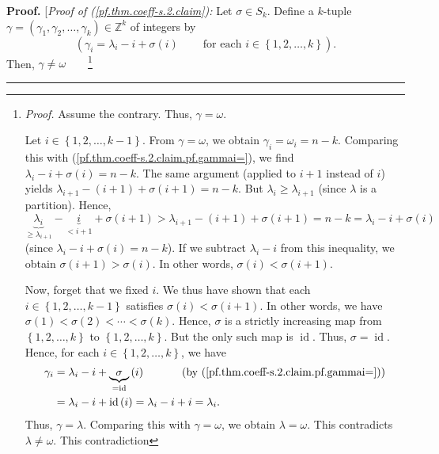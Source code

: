 \documentclass[numbers=enddot,12pt,final,onecolumn,notitlepage]{scrartcl}%
\theoremstyle{definition}
\newenvironment{proof}[1][Proof]{\noindent\textbf{#1.} }{\ \rule{0.5em}{0.5em}}
\begin{document}
\begin{proof}
[\textit{Proof of (\ref{pf.thm.coeff-s.2.claim}):} Let $\sigma\in S_{k}$.
Define a $k$-tuple $\gamma=\left(  \gamma_{1},\gamma_{2},\ldots,\gamma
_{k}\right)  \in\mathbb{Z}^{k}$ of integers by%
\begin{equation}
\left(  \gamma_{i}=\lambda_{i}-i+\sigma\left(  i\right)
\ \ \ \ \ \ \ \ \ \ \text{for each }i\in\left\{  1,2,\ldots,k\right\}
\right)  . \label{pf.thm.coeff-s.2.claim.pf.gammai=}%
\end{equation}
Then, $\gamma\neq\omega$\ \ \ \ \footnote{\textit{Proof.} Assume the contrary.
Thus, $\gamma=\omega$.
\par
Let $i\in\left\{  1,2,\ldots,k-1\right\}  $. From $\gamma=\omega$, we obtain
$\gamma_{i}=\omega_{i}=n-k$. Comparing this with
(\ref{pf.thm.coeff-s.2.claim.pf.gammai=}), we find $\lambda_{i}-i+\sigma
\left(  i\right)  =n-k$. The same argument (applied to $i+1$ instead of $i$)
yields $\lambda_{i+1}-\left(  i+1\right)  +\sigma\left(  i+1\right)  =n-k$.
But $\lambda_{i}\geq\lambda_{i+1}$ (since $\lambda$ is a partition). Hence,%
\[
\underbrace{\lambda_{i}}_{\geq\lambda_{i+1}}-\underbrace{i}_{<i+1}%
+\sigma\left(  i+1\right)  >\lambda_{i+1}-\left(  i+1\right)  +\sigma\left(
i+1\right)  =n-k=\lambda_{i}-i+\sigma\left(  i\right)
\]
(since $\lambda_{i}-i+\sigma\left(  i\right)  =n-k$). If we subtract
$\lambda_{i}-i$ from this inequality, we obtain $\sigma\left(  i+1\right)
>\sigma\left(  i\right)  $. In other words, $\sigma\left(  i\right)
<\sigma\left(  i+1\right)  $.
\par
Now, forget that we fixed $i$. We thus have shown that each $i\in\left\{
1,2,\ldots,k-1\right\}  $ satisfies $\sigma\left(  i\right)  <\sigma\left(
i+1\right)  $. In other words, we have $\sigma\left(  1\right)  <\sigma\left(
2\right)  <\cdots<\sigma\left(  k\right)  $. Hence, $\sigma$ is a strictly
increasing map from $\left\{  1,2,\ldots,k\right\}  $ to $\left\{
1,2,\ldots,k\right\}  $. But the only such map is $\operatorname*{id}$. Thus,
$\sigma=\operatorname*{id}$. Hence, for each $i\in\left\{  1,2,\ldots
,k\right\}  $, we have
\begin{align*}
\gamma_{i}  &  =\lambda_{i}-i+\underbrace{\sigma}_{=\operatorname*{id}}\left(
i\right)  \ \ \ \ \ \ \ \ \ \ \left(  \text{by
(\ref{pf.thm.coeff-s.2.claim.pf.gammai=})}\right) \\
&  =\lambda_{i}-i+\operatorname*{id}\left(  i\right)  =\lambda_{i}%
-i+i=\lambda_{i}.
\end{align*}
Thus, $\gamma=\lambda$. Comparing this with $\gamma=\omega$, we obtain
$\lambda=\omega$. This contradicts $\lambda\neq\omega$. This contradiction
}
\end{proof}
\end{document}
